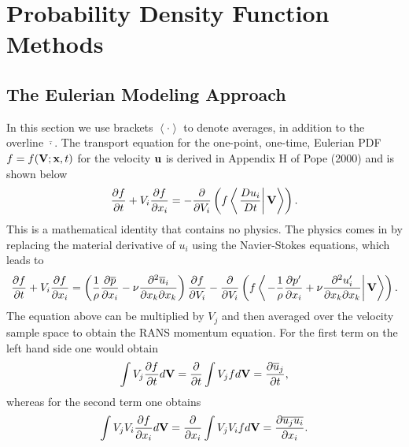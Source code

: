 \documentclass[oneside,a4paper,11pt]{report}
\newcommand{\pavg}{\overline{p}}
\newcommand{\uavg}{\overline{u}}
\newcommand{\pfluc}{p'}
\newcommand{\ufluc}{u'}
\begin{document}
\chapter{Probability Density Function Methods}

\section{The Eulerian Modeling Approach}

In this section we use brackets $\left < \cdot \right >$ to denote averages, in addition to the overline $\overline{\cdot}$. The transport equation for the one-point, one-time, Eulerian PDF $f=f(\mathbf{V} ;\mathbf{x},t)$ for the velocity $\mathbf{u}$ is derived in Appendix H of Pope (2000) and is shown below
\begin{equation}
\frac{\partial f}{\partial t} + V_i\frac{\partial f}{\partial x_i} = -\frac{\partial}{\partial V_i} \left ( f \left < \left . \frac{Du_i}{Dt} \right | \mathbf{V} \right > \right ).
\end{equation}
This is a mathematical identity that contains no physics. The physics comes in by replacing the material derivative of $u_i$ using the Navier-Stokes equations, which leads to
\begin{equation}
\label{pdf_ns}
\frac{\partial f}{\partial t} + V_i\frac{\partial f}{\partial x_i} = \left ( \frac{1}{\rho} \frac{\partial \pavg}{\partial x_i} -\nu \frac{\partial^2 \uavg_i}{\partial x_k \partial x_k} \right) \frac{\partial f}{\partial V_i} - \frac{\partial}{\partial V_i} \left ( f \left < \left . - \frac{1}{\rho} \frac{\partial \pfluc}{\partial x_i} +  \nu \frac{\partial ^2 \ufluc_i}{\partial x_k \partial x_k} \right | \Vvec \right > \right ).
\end{equation}
The equation above can be multiplied by $V_j$ and then averaged over the velocity sample space to obtain the RANS momentum equation. For the first term on the left hand side one would obtain
\begin{equation}
\int V_j \frac{\partial f}{\partial t} d\Vvec = \frac{\partial}{\partial t} \int V_j f d\Vvec = \frac{\partial \uavg_j}{\partial t},
\end{equation} 
whereas for the second term one obtains
\begin{equation}
\int V_j V_i \frac{\partial f}{\partial x_i} d\mathbf{V} = \frac{\partial}{\partial x_i} \int V_j V_i f d\mathbf{V} = \frac{\partial \overline{u_j u_i}}{\partial x_i}.
\end{equation} 
\end{document}

